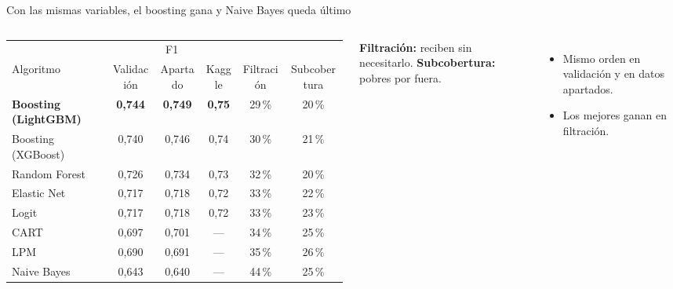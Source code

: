 \documentclass[aspectratio=169,11pt]{beamer}
\begin{document}
\begin{frame}{Con las mismas variables, el boosting gana y Naive Bayes queda último}
  \begin{columns}[c]
      \centering\scriptsize\renewcommand{\arraystretch}{1.1}\setlength{\tabcolsep}{3pt}
      \begin{tabular}{@{}lccccc@{}}
        \toprule
        & \multicolumn{3}{c}{F1} & & \\
        \cmidrule(lr){2-4}
        Algoritmo & Validación & Apartado & Kaggle & Filtración & Subcobertura \\
        \midrule
        \textbf{Boosting (LightGBM)} & \textbf{0,744} & \textbf{0,749} & \textbf{0,75} & 29\,\% & 20\,\% \\
        Boosting (XGBoost) & 0,740 & 0,746 & 0,74 & 30\,\% & 21\,\% \\
        Random Forest & 0,726 & 0,734 & 0,73 & 32\,\% & 20\,\% \\
        Elastic Net & 0,717 & 0,718 & 0,72 & 33\,\% & 22\,\% \\
        Logit & 0,717 & 0,718 & 0,72 & 33\,\% & 23\,\% \\
        CART & 0,697 & 0,701 & --- & 34\,\% & 25\,\% \\
        LPM & 0,690 & 0,691 & --- & 35\,\% & 26\,\% \\
        Naive Bayes & 0,643 & 0,640 & --- & 44\,\% & 25\,\% \\
        \bottomrule
      \end{tabular}
      \footnotesize
      \textbf{Filtración:} reciben sin necesitarlo.
      \textbf{Subcobertura:} pobres por fuera.
      \begin{itemize}
        \item Mismo orden en validación y en datos apartados.
        \item Los mejores ganan en filtración.
      \end{itemize}
  \end{columns}
\end{frame}
\end{document}
